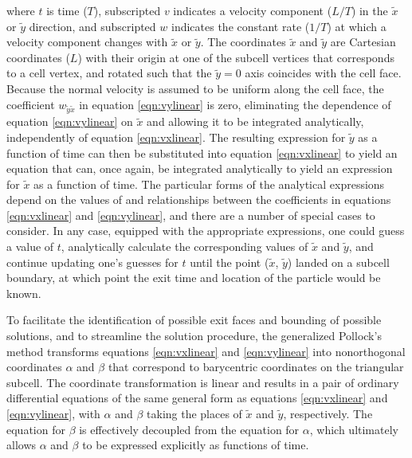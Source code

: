 \noindent where $t$ is time ($T$), subscripted $v$ indicates a velocity component ($L/T$) in the $\tilde{x}$ or $\tilde{y}$ direction, and subscripted $w$ indicates the constant rate ($1/T$) at which a velocity component changes with $\tilde{x}$ or $\tilde{y}$. The coordinates $\tilde{x}$ and $\tilde{y}$ are Cartesian coordinates ($L$) with their origin at one of the subcell vertices that corresponds to a cell vertex, and rotated such that the $\tilde{y} = 0$ axis coincides with the cell face. Because the normal velocity is assumed to be uniform along the cell face, the coefficient $w_{\tilde{y} \tilde{x}}$ in equation \ref{eqn:vylinear} is zero, eliminating the dependence of equation \ref{eqn:vylinear} on $\tilde{x}$ and allowing it to be integrated analytically, independently of equation \ref{eqn:vxlinear}. The resulting expression for $\tilde{y}$ as a function of time can then be substituted into equation \ref{eqn:vxlinear} to yield an equation that can, once again, be integrated analytically to yield an expression for $\tilde{x}$ as a function of time. The particular forms of the analytical expressions depend on the values of and relationships between the coefficients in equations \ref{eqn:vxlinear} and \ref{eqn:vylinear}, and there are a number of special cases to consider. In any case, equipped with the appropriate expressions, one could guess a value of $t$, analytically calculate the corresponding values of $\tilde{x}$ and $\tilde{y}$, and continue updating one's guesses for $t$ until the point ($\tilde{x}$, $\tilde{y}$) landed on a subcell boundary, at which point the exit time and location of the particle would be known.

To facilitate the identification of possible exit faces and bounding of possible solutions, and to streamline the solution procedure, the generalized Pollock's method transforms equations \ref{eqn:vxlinear} and \ref{eqn:vylinear} into nonorthogonal coordinates $\alpha$ and $\beta$ that correspond to barycentric coordinates on the triangular subcell. The coordinate transformation is linear and results in a pair of ordinary differential equations of the same general form as equations \ref{eqn:vxlinear} and \ref{eqn:vylinear}, with $\alpha$ and $\beta$ taking the places of $\tilde{x}$ and $\tilde{y}$, respectively. The equation for $\beta$ is effectively decoupled from the equation for $\alpha$, which ultimately allows $\alpha$ and $\beta$ to be expressed explicitly as functions of time.

